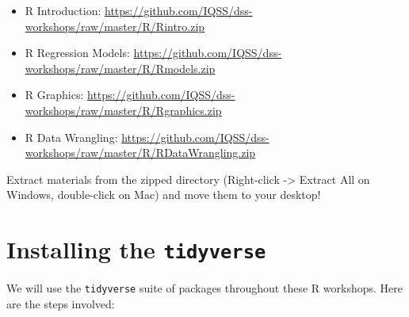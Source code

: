 \documentclass[]{book}
\providecommand{\tightlist}{%
  \setlength{\itemsep}{0pt}\setlength{\parskip}{0pt}}
\begin{document}
\begin{itemize}
\tightlist
\item
  R Introduction:
  \url{https://github.com/IQSS/dss-workshops/raw/master/R/Rintro.zip}
\item
  R Regression Models:
  \url{https://github.com/IQSS/dss-workshops/raw/master/R/Rmodels.zip}
\item
  R Graphics:
  \url{https://github.com/IQSS/dss-workshops/raw/master/R/Rgraphics.zip}
\item
  R Data Wrangling:
  \url{https://github.com/IQSS/dss-workshops/raw/master/R/RDataWrangling.zip}
\end{itemize}

Extract materials from the zipped directory (Right-click -\textgreater{}
Extract All on Windows, double-click on Mac) and move them to your
desktop!

\section{\texorpdfstring{Installing the
\texttt{tidyverse}}{Installing the tidyverse}}\label{installing-the-tidyverse}

We will use the \texttt{tidyverse} suite of packages throughout these R
workshops. Here are the steps involved:
\end{document}
